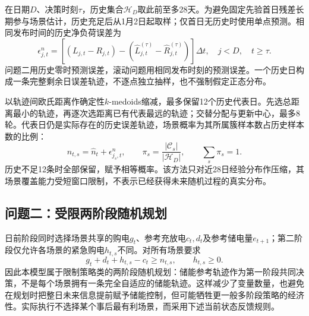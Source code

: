 在日期$D$、决策时刻$\tau$，历史集合$\mathcal H_D$取此前至多28天。为避免固定先验首日残差长期参与场景估计，历史充足后从1月2日起取样；仅首日无历史时使用单点预测。相同发布时间的历史净负荷误差为
\begin{equation}
 \epsilon^{n}_{j,t}
 =\left[(L_{j,t}-R_{j,t})-(\widehat L_{j,t}^{(\tau)}-\widehat R_{j,t}^{(\tau)})\right]\Delta t,
 \quad j<D,\quad t\ge\tau.
 \label{eq:residual}
\end{equation}
问题二用历史零时预测误差，滚动问题用相同发布时刻的预测误差。一个历史日构成一条完整剩余日误差轨迹，不逐点独立抽样，也不强制假定正态分布。

以轨迹间欧氏距离作确定性$k$-medoids缩减，最多保留12个历史代表日。先选总距离最小的轨迹，再逐次选距离已有代表最远的轨迹；交替分配与更新中心，最多8轮。代表日仍是实际存在的历史误差轨迹，场景概率为其所属簇样本数占历史样本数的比例：
\begin{equation}
 n_{t,s}=\widehat n_t+\epsilon^n_{j_s,t},\qquad
 \pi_s=\frac{|\mathcal C_s|}{|\mathcal H_D|},\qquad \sum_s\pi_s=1.
\end{equation}
历史不足12条时全部保留，赋予相等概率。该方法只对近28日经验分布作压缩，其场景覆盖能力受短窗口限制，不表示已经获得未来随机过程的真实分布。

\subsection{问题二：受限两阶段随机规划}

日前阶段同时选择场景共享的购电$g_t$、参考充放电$c_t,d_t$及参考储电量$e_{t+1}$；第二阶段仅允许各场景的紧急购电$h_{t,s}$不同。对所有场景要求
\begin{equation}
 g_t+d_t+h_{t,s}-c_t\ge n_{t,s},\qquad h_{t,s}\ge0.
 \label{eq:scenario_balance}
\end{equation}
因此本模型属于限制策略类的两阶段随机规划：储能参考轨迹作为第一阶段共同决策，不是每个场景拥有一条完全自适应的储能轨迹。这样减少了变量数量，也避免在规划时把整日未来信息提前赋予储能控制，但可能牺牲更一般多阶段策略的经济性。实际执行不选择某个事后最有利场景，而采用下述当前状态反馈规则。

